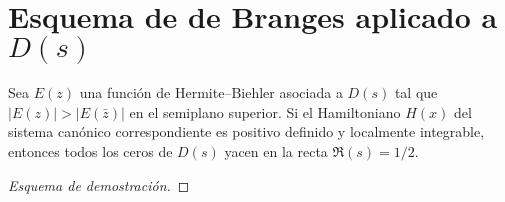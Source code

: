 \section{Esquema de de Branges aplicado a $D(s)$}

\begin{theorem}
Sea $E(z)$ una función de Hermite--Biehler asociada a $D(s)$ tal que
$|E(z)|>|E(\bar z)|$ en el semiplano superior. 
Si el Hamiltoniano $H(x)$ del sistema canónico correspondiente es positivo definido 
y localmente integrable, entonces todos los ceros de $D(s)$ yacen en la recta $\Re(s)=1/2$.
\end{theorem}

\begin{proof}[Esquema de demostración]
\end{proof}
